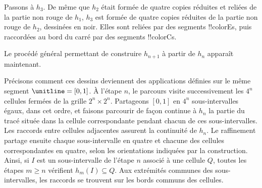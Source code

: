 \documentclass[../../../include/open-logic-section]{subfiles}
\begin{document}
Passons à $h_3$. De même que $h_2$ était formée de quatre copies
réduites et reliées de la partie non rouge de $h_1$, $h_3$ est
formée de quatre copies réduites de la partie non rouge de $h_2$,
dessinées en noir. Elles sont reliées par des segments !!{colorE}s,
puis raccordées au bord du carré par des segments !!{colorC}s.
\begin{center}
\end{center}
Le procédé général permettant de construire $h_{n+1}$ à partir
de $h_n$ apparaît maintenant.

Précisons comment ces dessins deviennent des applications définies
sur le même segment $\unitline=[0,1]$. À l'étape $n$, le parcours
visite successivement les $4^n$ cellules fermées de la grille
$2^n \times 2^n$. Partageons $[0,1]$ en $4^n$ sous-intervalles
égaux, dans cet ordre, et faisons parcourir de façon continue à
$h_n$ la partie du tracé située dans la cellule correspondante
pendant chacun de ces sous-intervalles. Les raccords entre
cellules adjacentes assurent la continuité de $h_n$.
Le raffinement partage ensuite chaque sous-intervalle en quatre
et chacune des cellules correspondantes en quatre, selon les
orientations indiquées par la construction. Ainsi, si $I$ est
un sous-intervalle de l'étape $n$ associé à une cellule $Q$,
toutes les étapes $m\geq n$ vérifient $h_m(I)\subseteq Q$.
Aux extrémités communes des sous-intervalles, les raccords se
trouvent sur les bords communs des cellules.
\end{document}

